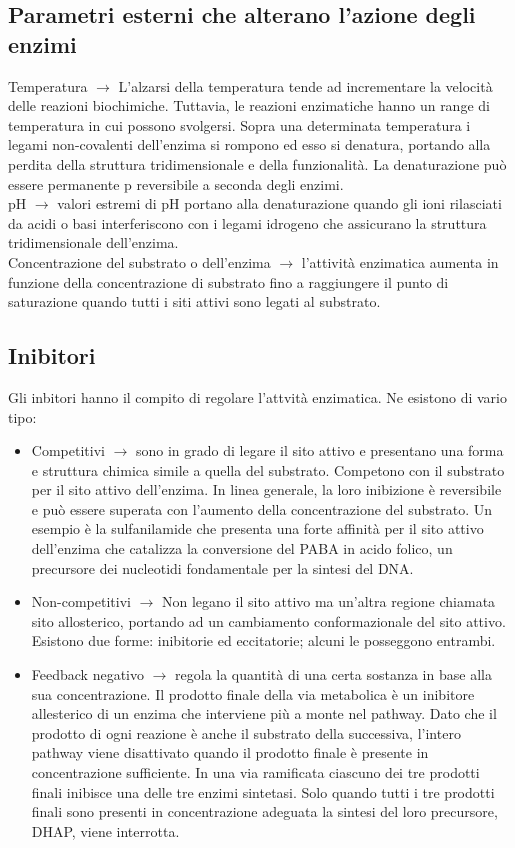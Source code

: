 \subsection{Parametri esterni che alterano l'azione degli enzimi}
Temperatura $\xrightarrow{}$ L'alzarsi della temperatura tende ad incrementare la velocit\`a delle reazioni biochimiche. Tuttavia, le reazioni enzimatiche hanno un range di temperatura in cui possono svolgersi. Sopra una determinata temperatura i legami non-covalenti dell'enzima si rompono ed esso si denatura, portando alla perdita della struttura tridimensionale e della funzionalit\`a. La denaturazione pu\`o essere permanente p reversibile a seconda degli enzimi.
\\pH $\xrightarrow{}$ valori estremi di pH portano alla denaturazione quando gli ioni rilasciati da acidi o basi interferiscono con i legami idrogeno che assicurano la struttura tridimensionale dell'enzima.
\\Concentrazione del substrato o dell'enzima $\xrightarrow{}$ l'attivit\`a enzimatica aumenta in funzione della concentrazione di substrato fino a raggiungere il punto di saturazione quando tutti i siti attivi sono legati al substrato.
\subsection{Inibitori}
Gli inbitori hanno il compito di regolare l'attvit\`a enzimatica. Ne esistono di vario tipo:
\begin{itemize}
    \item Competitivi $\xrightarrow{}$ sono in grado di legare il sito attivo e presentano una forma e struttura chimica simile a quella del substrato. Competono con il substrato per il sito attivo dell'enzima. In linea generale, la loro inibizione \`e reversibile e pu\`o essere superata con l'aumento della concentrazione del substrato. Un esempio \`e la sulfanilamide che presenta una forte affinit\`a per il sito attivo dell'enzima che catalizza la conversione del PABA in acido folico, un precursore dei nucleotidi fondamentale per la sintesi del DNA.
    \item Non-competitivi $\xrightarrow{}$ Non legano il sito attivo ma un'altra regione chiamata sito allosterico, portando ad un cambiamento conformazionale del sito attivo. Esistono due forme: inibitorie ed eccitatorie; alcuni le posseggono entrambi.
    \item Feedback negativo
    $\xrightarrow{}$ regola la quantit\`a di una certa sostanza in base alla sua concentrazione. Il prodotto finale della via metabolica \`e un inibitore allesterico di un enzima che interviene pi\`u a monte nel pathway. Dato che il prodotto di ogni reazione \`e anche il substrato della successiva, l'intero pathway viene disattivato quando il prodotto finale \`e presente in concentrazione sufficiente. In una via ramificata ciascuno dei tre prodotti finali inibisce una delle tre enzimi sintetasi. Solo quando tutti i tre prodotti finali sono presenti in concentrazione adeguata la sintesi del loro precursore, DHAP, viene interrotta. 
\end{itemize}
